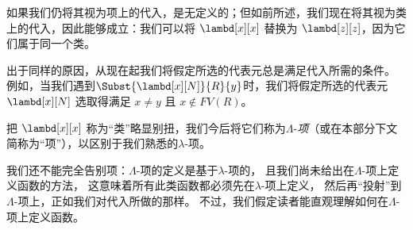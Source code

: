 \documentclass[../../../include/open-logic-section]{subfiles}
\begin{document}
如果我们仍将其视为项上的代入，是无定义的；但如前所述，我们现在将其视为类上的代入，因此能够成立：我们可以将 $\lambd[x][x]$ 替换为 $\lambd[z][z]$，因为它们属于同一个类。

出于同样的原因，从现在起我们将假定所选的代表元总是满足代入所需的条件。
例如，当我们遇到$\Subst{\lambd[x][N]}{R}{y}$时，我们将假定所选的代表元 $\lambd[x][N]$ 选取得满足 $x \neq y$ 且 $x \notin FV(R)$。

把 $\lambd[x][x]$ 称为“类”略显别扭，我们今后将它们称为$\Lambda$-\emph{项}（或在本部分下文简称为“项”），以区别于我们熟悉的$\lambda$-项。

\begin{editorial}
  我们还不能完全告别项：$\Lambda$-项的定义是基于$\lambda$-项的，
  且我们尚未给出在$\Lambda$-项上定义函数的方法，
  这意味着所有此类函数都必须先在$\lambda$-项上定义，
  然后再“投射”到$\Lambda$-项上，正如我们对代入所做的那样。
  不过，我们假定读者能直观理解如何在$\Lambda$-项上定义函数。
\end{editorial}
\end{document}
